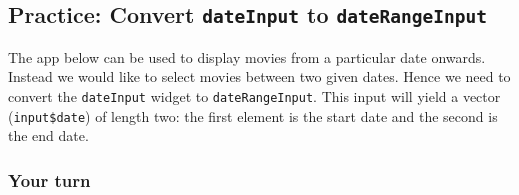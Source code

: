 \documentclass[
  letterpaper,
  DIV=11,
  numbers=noendperiod]{scrreprt}
\newenvironment{Shaded}{\begin{snugshade}}{\end{snugshade}}
\newcommand{\AttributeTok}[1]{\textcolor[rgb]{0.40,0.46,0.14}{#1}}
\newcommand{\CommentTok}[1]{\textcolor[rgb]{0.37,0.37,0.37}{#1}}
\newcommand{\ConstantTok}[1]{\textcolor[rgb]{0.56,0.35,0.01}{#1}}
\newcommand{\DecValTok}[1]{\textcolor[rgb]{0.68,0.00,0.00}{#1}}
\newcommand{\FunctionTok}[1]{\textcolor[rgb]{0.28,0.35,0.67}{#1}}
\newcommand{\NormalTok}[1]{\textcolor[rgb]{0.00,0.46,0.62}{#1}}
\newcommand{\OtherTok}[1]{\textcolor[rgb]{0.00,0.46,0.62}{#1}}
\newcommand{\SpecialCharTok}[1]{\textcolor[rgb]{0.37,0.37,0.37}{#1}}
\begin{document}
\begin{Shaded}
\end{Shaded}

\hypertarget{practice-convert-dateinput-to-daterangeinput}{%
\subsection{\texorpdfstring{Practice: Convert \texttt{dateInput} to
\texttt{dateRangeInput}}{Practice: Convert dateInput to dateRangeInput}}\label{practice-convert-dateinput-to-daterangeinput}}

The app below can be used to display movies from a particular date
onwards. Instead we would like to select movies between two given dates.
Hence we need to convert the \texttt{dateInput} widget to
\texttt{dateRangeInput}. This input will yield a vector
(\texttt{input\$date}) of length two: the first element is the start
date and the second is the end date.

\hypertarget{your-turn-13}{%
\subsubsection{Your turn}\label{your-turn-13}}
\end{document}
